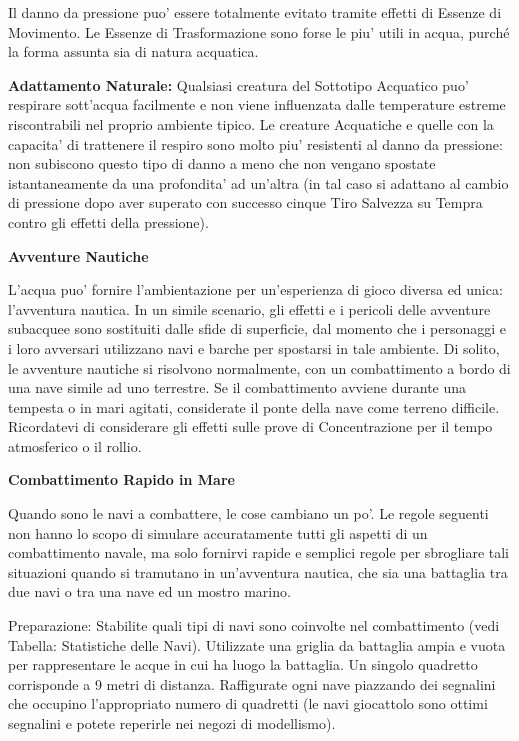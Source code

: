 \documentclass[a4paper,11pt,twoside,openany]{book}
\begin{document}
{		Il danno da pressione puo' essere totalmente evitato tramite effetti di Essenze di Movimento. Le Essenze di Trasformazione sono forse le piu' utili in acqua, purché la forma assunta sia di natura acquatica.
		
		\textbf{Adattamento Naturale:} Qualsiasi creatura del Sottotipo Acquatico puo' respirare sott'acqua facilmente e non viene influenzata dalle temperature estreme riscontrabili nel proprio ambiente tipico. Le creature Acquatiche e quelle con la capacita' di trattenere il respiro sono molto piu' resistenti al danno da pressione: non subiscono questo tipo di danno a meno che non vengano spostate istantaneamente da una profondita' ad un'altra (in tal caso si adattano al cambio di pressione dopo aver superato con successo cinque Tiro Salvezza su Tempra contro gli effetti della pressione).
		
		\textbf{Avventure Nautiche}
		
		L'acqua puo' fornire l'ambientazione per un'esperienza di gioco diversa ed unica: l'avventura nautica. In un simile scenario, gli effetti e i pericoli delle avventure subacquee sono sostituiti dalle sfide di superficie, dal momento che i personaggi e i loro avversari utilizzano navi e barche per spostarsi in tale ambiente. Di solito, le avventure nautiche si risolvono normalmente, con un combattimento a bordo di una nave simile ad uno terrestre. Se il combattimento avviene durante una tempesta o in mari agitati, considerate il ponte della nave come terreno difficile. Ricordatevi di considerare gli effetti sulle prove di Concentrazione per il tempo atmosferico o il rollio.
		
		\textbf{Combattimento Rapido in Mare}
		
		Quando sono le navi a combattere, le cose cambiano un po'. Le regole seguenti non hanno lo scopo di simulare accuratamente tutti gli aspetti di un combattimento navale, ma solo fornirvi rapide e semplici regole per sbrogliare tali situazioni quando si tramutano in un'avventura nautica, che sia una battaglia tra due navi o tra una nave ed un mostro marino.
		
		{Preparazione:} Stabilite quali tipi di navi sono coinvolte nel combattimento (vedi Tabella: Statistiche delle Navi). Utilizzate una griglia da battaglia ampia e vuota per rappresentare le acque in cui ha luogo la battaglia. Un singolo quadretto corrisponde a 9 metri di distanza. Raffigurate ogni nave piazzando dei segnalini che occupino l'appropriato numero di quadretti (le navi giocattolo sono ottimi segnalini e potete reperirle nei negozi di modellismo).{}
		
}
\end{document}
